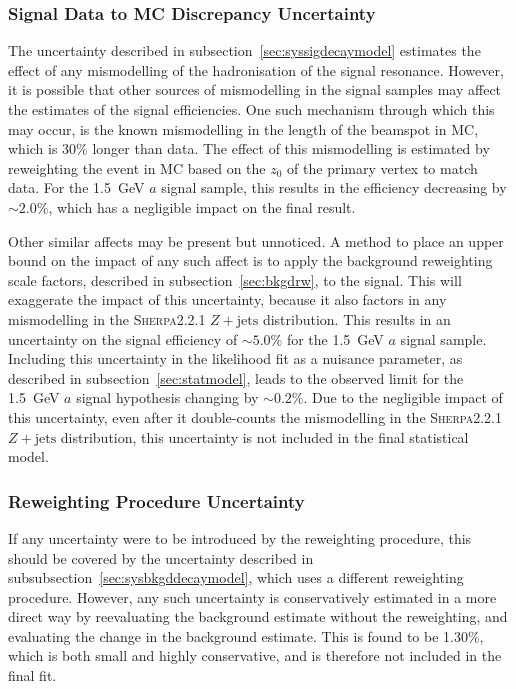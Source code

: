 \documentclass[NOTE, atlasdraft=true, texlive=2017, UKenglish]{\ATLASLATEXPATH atlasdoc}
\begin{document}
\subsubsection{Signal Data to MC Discrepancy Uncertainty}
\label{sec:syssigdatamc}

The uncertainty described in subsection~\ref{sec:syssigdecaymodel} estimates the effect of any mismodelling of the hadronisation of the signal resonance. However, it is possible that other sources of mismodelling in the signal samples may affect the estimates of the signal efficiencies. One such mechanism through which this may occur, is the known mismodelling in the length of the beamspot in MC, which is 30\% longer than data. The effect of this mismodelling is estimated by reweighting the event in MC based on the $z_0$ of the primary vertex to match data. For the 1.5~GeV $a$ signal sample, this results in the efficiency decreasing by $\sim 2.0\%$, which has a negligible impact on the final result.

Other similar affects may be present but unnoticed. A method to place an upper bound on the impact of any such affect is to apply the background reweighting scale factors, described in subsection~\ref{sec:bkgdrw}, to the signal. This will exaggerate the impact of this uncertainty, because it also factors in any mismodelling in the \textsc{Sherpa}2.2.1 $Z+\text{jets}$ distribution. This results in an uncertainty on the signal efficiency of $\sim 5.0\%$ for the 1.5~GeV $a$ signal sample. Including this uncertainty in the likelihood fit as a nuisance parameter, as described in subsection~\ref{sec:statmodel}, leads to the observed limit for the 1.5~GeV $a$ signal hypothesis changing by $\sim 0.2\%$. Due to the negligible impact of this uncertainty, even after it double-counts the mismodelling in the \textsc{Sherpa}2.2.1 $Z+\text{jets}$ distribution, this uncertainty is not included in the final statistical model.


\subsubsection{Reweighting Procedure Uncertainty}
\label{sec:sysrwproc}

If any uncertainty were to be introduced by the reweighting procedure, this should be covered by the uncertainty described in subsubsection~\ref{sec:sysbkgddecaymodel}, which uses a different reweighting procedure. However, any such uncertainty is conservatively estimated in a more direct way by reevaluating the background estimate without the reweighting, and evaluating the change in the background estimate. This is found to be 1.30\%, which is both small and highly conservative, and is therefore not included in the final fit.
\end{document}
